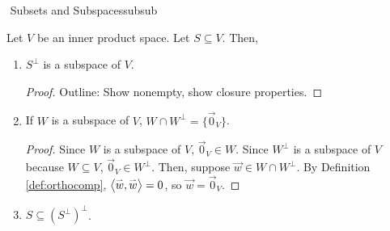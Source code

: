         \begin{theorem}{\Stop\,\,Subsets and Subspaces}{subsub}

            Let \(V\) be an inner product space. Let \(S\subseteq V\). Then,
            \begin{enumerate}
                \item \(S^\perp\) is a subspace of \(V\).
                \begin{proof}
                    Outline: Show nonempty, show closure properties.
                \end{proof}
                \item If \(W\) is a subspace of \(V\), \(W\cap W^\perp=\{\vec{0}_V\}\).
                \begin{proof}
                    Since \(W\) is a subspace of \(V\), \(\vec{0}_V\in W\). Since \(W^\perp\) is a subspace of \(V\) because \(W\subseteq V\), \(\vec{0}_V\in W^\perp\). Then, suppose \(\vec{w}\in W\cap W^\perp\). By Definition \ref{def:orthocomp}, \(\left\langle \overset{_{\rightharpoonup}}{w},\overset{_{\rightharpoonup}}{w}\right\rangle=0\), so \(\vec{w}=\vec{0}_V\).
                \end{proof}
                \item \(S\subseteq (S^\perp)^\perp\).
            \end{enumerate}
            
        \end{theorem}
